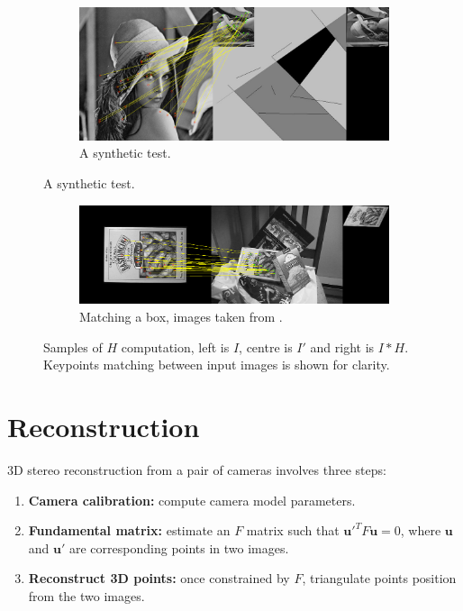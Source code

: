 \documentclass[12pt]{article}
\begin{document}
\begin{figure}[htbp!]
        \centering
        \begin{subfigure}[b]{0.8\textwidth}
                \includegraphics[width=\textwidth]{images/ransac2}
                \caption{A synthetic test.}
                \label{fig:ransac1}
        \end{subfigure}    
\end{figure}

\begin{figure}[htbp]
		\ContinuedFloat
		\centering        
        \begin{subfigure}[b]{0.8\textwidth}
                \includegraphics[width=\textwidth]{images/ransac1}
                \caption{Matching a box, images taken from \cite{Lowe2004}.}
                \label{fig:ransac2}
        \end{subfigure} 
        \caption{Samples of $H$ computation, left is $I$, centre is $I'$ and right is $I * H$. Keypoints matching between input images is shown for clarity.}\label{fig:ransacSample}
\end{figure}

\FloatBarrier
\section{Reconstruction}

3D stereo reconstruction from a pair of cameras involves three steps:
\begin{enumerate}
\item \textbf{Camera calibration:} compute camera model parameters.
\item \textbf{Fundamental matrix:} estimate an $F$ matrix such that $\mathbf{u}'^TF\mathbf{u} = 0$, where $\mathbf{u}$ and $\mathbf{u}'$ are corresponding points in two images.
\item \textbf{Reconstruct 3D points:} once constrained by $F$, triangulate points position from the two images.
\end{enumerate}
\end{document}
